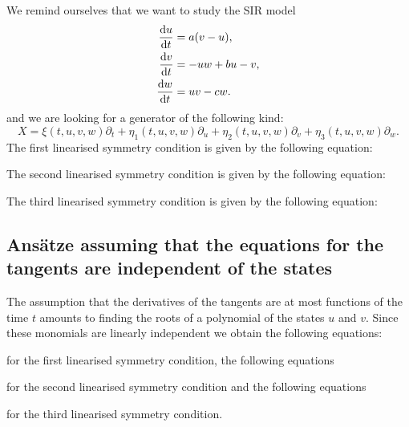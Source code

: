 We remind ourselves that we want to study the SIR model
\begin{equation*}
  \begin{split}
    \dv{u}{t}&=a(v-u),\\
    \dv{v}{t}&=-uw+bu-v,\\
    \dv{w}{t}&=uv-cw.
    \end{split}
  \end{equation*}
  and we are looking for a generator of the following kind:
\begin{equation}
X=\xi(t,u,v,w)\partial_t+\eta_1(t,u,v,w)\partial_u+\eta_2(t,u,v,w)\partial_v+\eta_3(t,u,v,w)\partial_w.
\end{equation}
The first linearised symmetry condition is given by the following equation:

The second linearised symmetry condition is given by the following equation:

The third linearised symmetry condition is given by the following equation:
\subsection{Ans\"atze assuming that the equations for the tangents are independent of the states}
The assumption that the derivatives of the tangents are at most functions of the time $t$ amounts to finding the roots of a polynomial of the states $u$ and $v$. Since these monomials are linearly independent we obtain the following equations:

for the first linearised symmetry condition, the following equations

for the second linearised symmetry condition and the following equations

for the third linearised symmetry condition.